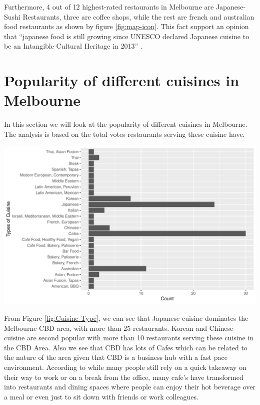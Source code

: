 \documentclass[11pt,a4paper,]{article}
\let\origfigure\figure
\let\endorigfigure\endfigure
\renewenvironment{figure}[1][2] {
    \expandafter\origfigure\expandafter[H]
} {
    \endorigfigure
}%
\begin{document}
Furthermore, 4 out of 12 highest-rated restaurants in Melbourne are Japanese-Sushi Restaurants, three are coffee shops, while the rest are french and australian food restaurants as shown by figure \ref{fig:map-icon}.
This fact support an opinion that ``japanese food is still growing since UNESCO declared Japanese cuisine to be an Intangible Cultural Heritage in 2013'' \textcite{sushi}.

\clearpage

\hypertarget{popularity-of-different-cuisines-in-melbourne}{%
\section{Popularity of different cuisines in Melbourne}\label{popularity-of-different-cuisines-in-melbourne}}

In this section we will look at the popularity of different cuisines in Melbourne. The analysis is based on the total votes restaurants serving these cuisine have.

\begin{figure}
\centering
\includegraphics{assignment4_files/figure-latex/Cuisine-Type-1.pdf}
\caption{\label{fig:Cuisine-Type}Number of restaurants for different Cuisines in Melbourne}
\end{figure}

From Figure \ref{fig:Cuisine-Type}, we can see that Japanese cuisine dominates the Melbourne CBD area, with more than 25 restaurants. Korean and Chinese cuisine are second popular with more than 10 restaurants serving these cuisine in the CBD Area. Also we see that CBD has lots of Cafes which can be related to the nature of the area given that CBD is a business hub with a fast pace environment. According to \textcite{Coffee} while many people still rely on a quick takeaway on their way to work or on a break from the office, many cafe's have transformed into restaurants and dining spaces where people can enjoy their hot beverage over a meal or even just to sit down with friends or work colleagues.
\end{document}
